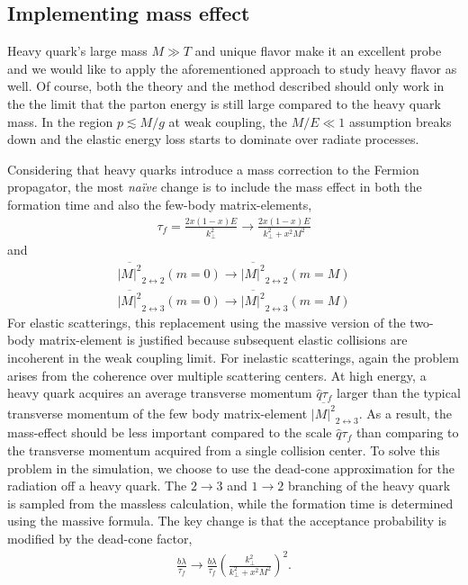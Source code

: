\subsection{Implementing mass effect}
Heavy quark's large mass $M\gg T$ and unique flavor make it an excellent probe and we would like to apply the aforementioned approach to study heavy flavor as well. 
Of course, both the theory and the method described should only work in the the limit that the parton energy is still large compared to the heavy quark mass.
In the region $p \lesssim M/g$ at weak coupling, the $M/E \ll 1$ assumption breaks down and the elastic energy loss starts to dominate over radiate processes.

Considering that heavy quarks introduce a mass correction to the Fermion propagator, the most {\it na\"ive } change is to include the mass effect in both the formation time and also the few-body matrix-elements,
\begin{eqnarray}
\tau_f = \frac{2x(1-x)E}{k_\perp^2} \rightarrow \frac{2x(1-x)E}{k_\perp^2 + x^2 M^2}
\end{eqnarray}
and 
\begin{eqnarray}
\overline{|M|^2}_{2\leftrightarrow 2}(m=0) \rightarrow \overline{|M|^2}_{2\leftrightarrow 2}(m=M)\\
\overline{|M|^2}_{2\leftrightarrow 3}(m=0) \rightarrow \overline{|M|^2}_{2\leftrightarrow 3}(m=M)
\end{eqnarray}
For elastic scatterings, this replacement using the massive version of the two-body matrix-element is justified because subsequent elastic collisions are incoherent in the weak coupling limit.
For inelastic scatterings, again the problem arises from the coherence over multiple scattering centers.
At high energy, a heavy quark acquires an average transverse momentum $\hat{q} \tau_f$ larger than the typical transverse momentum of the few body matrix-element $\overline{|M|^2}_{2\leftrightarrow 3}$.
As a result, the mass-effect should be less important compared to the scale $\hat{q} \tau_f$ than comparing to the transverse momentum acquired from a single collision center. 
To solve this problem in the simulation, we choose to use the dead-cone approximation for the radiation off a heavy quark.
The $2\rightarrow 3$ and $1\rightarrow 2$ branching of the heavy quark is sampled from the massless calculation, while the formation time is determined using the massive formula.
The key change is that the acceptance probability is modified by the dead-cone factor,
\begin{eqnarray}
\frac{b\lambda}{\tau_f} \rightarrow \frac{b\lambda}{\tau_f} \left(\frac{k_\perp^2}{k_\perp^2+x^2M^2}\right)^2.
\end{eqnarray}
